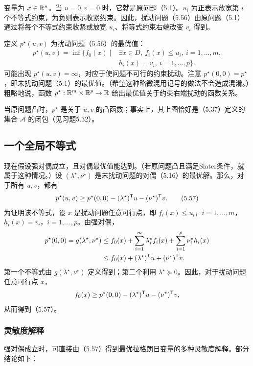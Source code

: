 变量为 $x\in\mathbb R^n$。当 $u=0,v=0$ 时，它就是原问题（5.1）。$u_i$ 为正表示放宽第 $i$ 个不等式约束，为负则表示收紧约束。因此，扰动问题（5.56）由原问题（5.1）通过将每个不等式约束收紧或放宽 $u_i$、将等式约束右端改变 $v_i$ 得到。

定义 $p^\star(u,v)$ 为扰动问题（5.56）的最优值：
\[
\begin{split}
p^\star(u,v)=\inf\{f_0(x)\mid{}&\exists x\in D,\ f_i(x)\le u_i,\ i=1,\ldots,m,\\
&h_i(x)=v_i,\ i=1,\ldots,p\}.
\end{split}
\]
可能出现 $p^\star(u,v)=\infty$，对应于使问题不可行的约束扰动。注意 $p^\star(0,0)=p^\star$，即未扰动问题（5.1）的最优值。（希望这种略微混用记号的做法不会造成混淆。）粗略地说，函数 $p^\star:\mathbb R^m\times\mathbb R^p\to\mathbb R$ 给出最优值关于约束右端扰动的函数关系。

当原问题凸时，$p^\star$ 是关于 $u,v$ 的凸函数；事实上，其上图恰好是（5.37）定义的集合 $\mathcal A$ 的闭包（见习题5.32）。

\subsection{一个全局不等式}
现在假设强对偶成立，且对偶最优值能达到。（若原问题凸且满足Slater条件，就属于这种情况。）设 $(\lambda^\star,\nu^\star)$ 是未扰动问题的对偶（5.16）的最优解。那么，对于所有 $u,v$，都有
\begin{equation}
p^\star(u,v)\ge p^\star(0,0)-(\lambda^\star)^\mathsf T u-(\nu^\star)^\mathsf T v.\tag{5.57}
\end{equation}
为证明该不等式，设 $x$ 是扰动问题任意可行点，即 $f_i(x)\le u_i$，$i=1,\ldots,m$，$h_i(x)=v_i$，$i=1,\ldots,p$。由强对偶，
\[
\begin{aligned}
p^\star(0,0)=g(\lambda^\star,\nu^\star)
&\le f_0(x)+\sum_{i=1}^m\lambda_i^\star f_i(x)
+\sum_{i=1}^p\nu_i^\star h_i(x)\\
&\le f_0(x)+(\lambda^\star)^\mathsf T u+(\nu^\star)^\mathsf T v.
\end{aligned}
\]
第一个不等式由 $g(\lambda^\star,\nu^\star)$ 定义得到；第二个利用 $\lambda^\star\succeq0$。因此，对于扰动问题任意可行点 $x$，
\[
f_0(x)\ge p^\star(0,0)-(\lambda^\star)^\mathsf T u-(\nu^\star)^\mathsf T v,
\]
从而得到（5.57）。

\subsubsection*{灵敏度解释}
强对偶成立时，可直接由（5.57）得到最优拉格朗日变量的多种灵敏度解释。部分结论如下：

